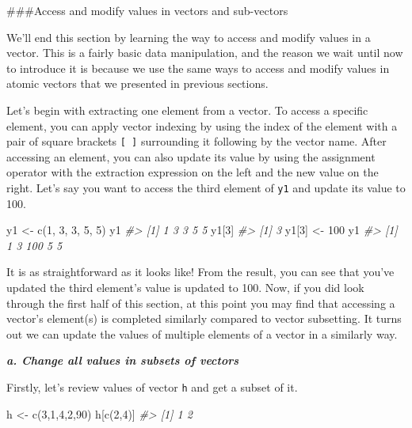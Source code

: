 \documentclass[
]{book}
\newenvironment{Shaded}{\begin{snugshade}}{\end{snugshade}}
\newcommand{\CommentTok}[1]{\textcolor[rgb]{0.56,0.35,0.01}{\textit{#1}}}
\newcommand{\DecValTok}[1]{\textcolor[rgb]{0.00,0.00,0.81}{#1}}
\newcommand{\FunctionTok}[1]{\textcolor[rgb]{0.00,0.00,0.00}{#1}}
\newcommand{\NormalTok}[1]{#1}
\newcommand{\OtherTok}[1]{\textcolor[rgb]{0.56,0.35,0.01}{#1}}
\begin{document}
\#\#\#Access and modify values in vectors and sub-vectors

We'll end this section by learning the way to access and modify values in a vector. This is a fairly basic data manipulation, and the reason we wait until now to introduce it is because we use the same ways to access and modify values in atomic vectors that we presented in previous sections.

Let's begin with extracting one element from a vector. To access a specific element, you can apply vector indexing by using the index of the element with a pair of square brackets \texttt{{[}\ {]}} surrounding it following by the vector name. After accessing an element, you can also update its value by using the assignment operator with the extraction expression on the left and the new value on the right. Let's say you want to access the third element of \texttt{y1} and update its value to 100.

\begin{Shaded}
\begin{Highlighting}[]
\NormalTok{y1 }\OtherTok{\textless{}{-}} \FunctionTok{c}\NormalTok{(}\DecValTok{1}\NormalTok{, }\DecValTok{3}\NormalTok{, }\DecValTok{3}\NormalTok{, }\DecValTok{5}\NormalTok{, }\DecValTok{5}\NormalTok{)}
\NormalTok{y1}
\CommentTok{\#\textgreater{} [1] 1 3 3 5 5}
\NormalTok{y1[}\DecValTok{3}\NormalTok{]}
\CommentTok{\#\textgreater{} [1] 3}
\NormalTok{y1[}\DecValTok{3}\NormalTok{] }\OtherTok{\textless{}{-}} \DecValTok{100}
\NormalTok{y1}
\CommentTok{\#\textgreater{} [1]   1   3 100   5   5}
\end{Highlighting}
\end{Shaded}

It is as straightforward as it looks like! From the result, you can see that you've updated the third element's value is updated to 100. Now, if you did look through the first half of this section, at this point you may find that accessing a vector's element(s) is completed similarly compared to vector subsetting. It turns out we can update the values of multiple elements of a vector in a similarly way.

\textbf{\emph{a. Change all values in subsets of vectors}}

Firstly, let's review values of vector \texttt{h} and get a subset of it.

\begin{Shaded}
\begin{Highlighting}[]
\NormalTok{h }\OtherTok{\textless{}{-}} \FunctionTok{c}\NormalTok{(}\DecValTok{3}\NormalTok{,}\DecValTok{1}\NormalTok{,}\DecValTok{4}\NormalTok{,}\DecValTok{2}\NormalTok{,}\DecValTok{90}\NormalTok{)}
\NormalTok{h[}\FunctionTok{c}\NormalTok{(}\DecValTok{2}\NormalTok{,}\DecValTok{4}\NormalTok{)]}
\CommentTok{\#\textgreater{} [1] 1 2}
\end{Highlighting}
\end{Shaded}
\end{document}
